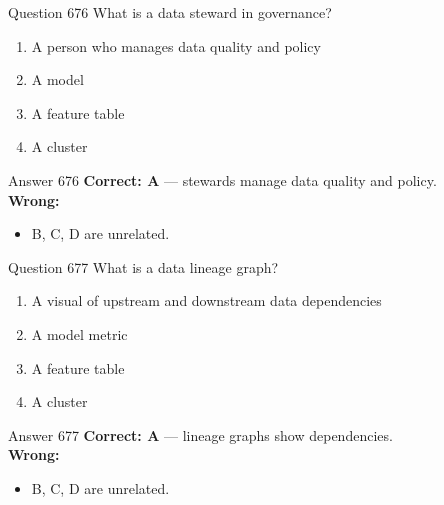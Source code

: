 \documentclass[aspectratio=169,11pt]{beamer}
\begin{document}
	\begin{frame}{Question 676}
		What is a data steward in governance?
		\begin{enumerate}[label=\Alph*.]
			\item A person who manages data quality and policy
			\item A model
			\item A feature table
			\item A cluster
		\end{enumerate}
	\end{frame}
	\begin{frame}{Answer 676}
		\textbf{Correct: A} --- stewards manage data quality and policy.\\
		\vspace{0.5em}
		\textbf{Wrong:}
		\begin{itemize}
			\item B, C, D are unrelated.
		\end{itemize}
	\end{frame}
	
	\begin{frame}{Question 677}
		What is a data lineage graph?
		\begin{enumerate}[label=\Alph*.]
			\item A visual of upstream and downstream data dependencies
			\item A model metric
			\item A feature table
			\item A cluster
		\end{enumerate}
	\end{frame}
	\begin{frame}{Answer 677}
		\textbf{Correct: A} --- lineage graphs show dependencies.\\
		\vspace{0.5em}
		\textbf{Wrong:}
		\begin{itemize}
			\item B, C, D are unrelated.
		\end{itemize}
	\end{frame}
	
\end{document}
